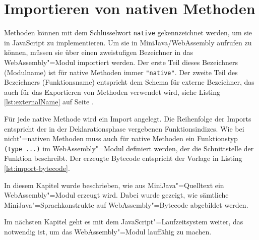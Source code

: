 \section{Importieren von nativen Methoden}

Methoden können mit dem Schlüsselwort \lstinline{native} gekennzeichnet werden, um sie in JavaScript zu implementieren. Um sie in MiniJava/WebAssembly aufrufen zu können, müssen sie über einen zweistufigen Bezeichner in das WebAssembly"=Modul importiert werden. Der erste Teil dieses Bezeichners (Modulname) ist für native Methoden immer \lstinline{"native"}. Der zweite Teil des Bezeichners (Funktionsname) entspricht dem Schema für externe Bezeichner, das auch für das Exportieren von Methoden verwendet wird, siehe Listing \ref{lst:externalName} auf Seite \pageref{lst:externalName}.

Für jede native Methode wird ein Import angelegt. Die Reihenfolge der Imports entspricht der in der Deklarationsphase vergebenen Funktionsindizes. Wie bei nicht"=nativen Methoden muss auch für native Methoden ein Funktionstyp \lstinline{(type ...)} im WebAssembly"=Modul definiert werden, der die Schnittstelle der Funktion beschreibt. Der erzeugte Bytecode entspricht der Vorlage in Listing \ref{lst:import-bytecode}.



\vspace{4em}
In diesem Kapitel wurde beschrieben, wie aus MiniJava"=Quelltext ein WebAssembly"=Modul erzeugt wird. Dabei wurde gezeigt, wie sämtliche MiniJava"=Sprachkonstrukte auf WebAssembly"=Bytecode abgebildet werden.

Im nächsten Kapitel geht es mit dem JavaScript"=Laufzeitsystem weiter, das notwendig ist, um das WebAssembly"=Modul lauffähig zu machen.
